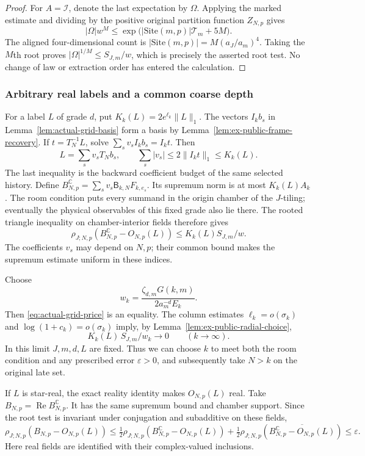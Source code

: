 \begin{proof}
For $A=\mathcal I$, denote the last expectation by $\Omega$. Applying
the marked estimate and dividing by the positive original partition
function $Z_{N,p}$ gives
\[
 |\Omega|w^M\leq
     \exp\bigl(|\mathrm{Site}(m,p)|\mathcal T_m+5M\bigr).
\]
The aligned four-dimensional count is
$|\mathrm{Site}(m,p)|=M(a_J/a_m)^4$. Taking the $M$th root proves
$|\Omega|^{1/M}\leq S_{J,m}/w$, which is precisely the asserted root
test. No change of law or extraction order has entered the calculation.
\end{proof}

\subsubsection{Arbitrary real labels and a common coarse depth}

For a label $L$ of grade $d$, put
$K_k(L)=2e^{\ell_k}\|L\|_1$.
The vectors $I_kb_s$ in Lemma~\ref{lem:actual-grid-basis} form a basis by
Lemma~\ref{lem:ex-public-frame-recovery}. If $t=T_N^{-1}L$, solve
$\sum_s v_sI_kb_s=I_kt$. Then
\[
 L=\sum_s v_sT_Nb_s,\qquad
 \sum_s|v_s|\leq2\|I_kt\|_1\leq K_k(L).
\]
The last inequality is the backward coefficient budget of the same
selected history. Define
$B^{\mathbb C}_{N,p}=\sum_s v_s\mathsf B_{k,N}F_{k,e_s}$.
Its supremum norm is at most $K_k(L)A_k$. The room condition puts every
summand in the origin chamber of the $J$-tiling; eventually the physical
observables of this fixed grade also lie there. The rooted triangle
inequality on chamber-interior fields therefore gives
\[
 \rho_{J;N,p}(B^{\mathbb C}_{N,p}-O_{N,p}(L))
                  \leq K_k(L)S_{J,m}/w.
\]
The coefficients $v_s$ may depend on $N,p$; their common bound makes the
supremum estimate uniform in these indices.

Choose
\[
 w_k=\frac{\zeta_{d,m}G(k,m)}{2a_m^{-d}E_k}.
\]
Then \eqref{eq:actual-grid-price} is an equality. The column estimates
$\ell_k=o(\sigma_k)$ and $\log(1+c_k)=o(\sigma_k)$ imply, by
Lemma~\ref{lem:ex-public-radial-choice},
\[
 K_k(L)\,S_{J,m}/w_k\longrightarrow0\qquad(k\to\infty).
\] In this limit $J,m,d,L$ are fixed.
Thus we can choose $k$ to meet both the room condition and any prescribed
error $\varepsilon>0$, and subsequently take $N>k$ on the original late
set.

If $L$ is star-real, the exact reality identity makes $O_{N,p}(L)$ real.
Take $B_{N,p}=\operatorname{Re}B^{\mathbb C}_{N,p}$. It has the same
supremum bound and chamber support. Since the root test is invariant under
conjugation and subadditive on these fields,
\[
 \rho_{J;N,p}(B_{N,p}-O_{N,p}(L))
 \leq\tfrac12\rho_{J;N,p}(B^{\mathbb C}_{N,p}-O_{N,p}(L))
     +\tfrac12\rho_{J;N,p}
          (\overline{B^{\mathbb C}_{N,p}-O_{N,p}(L)})
 \leq\varepsilon.
\]
Here real fields are identified with their complex-valued inclusions.

